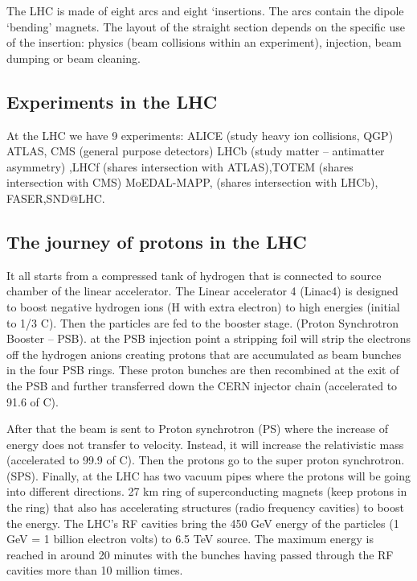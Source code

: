 The LHC is made of eight arcs and eight ‘insertions. The arcs contain the dipole ‘bending’ magnets. The layout of the straight section depends on the specific use of the insertion: physics (beam collisions within an experiment), injection, beam dumping or beam cleaning.

\subsection{Experiments in the LHC}

At the LHC we have 9 experiments: 
ALICE (study heavy ion collisions, QGP) ATLAS, CMS  (general purpose detectors) LHCb (study matter – antimatter asymmetry) ,LHCf (shares intersection with ATLAS),TOTEM (shares intersection with CMS) MoEDAL-MAPP, (shares intersection with LHCb), FASER,SND@LHC. 
\subsection{The journey of protons in the LHC}

It all starts from a compressed tank of hydrogen that is connected to source chamber of the linear accelerator. The Linear accelerator 4 (Linac4) is designed to boost negative hydrogen ions (H with extra electron) to high energies (initial to 1/3 C). Then the particles are fed to the booster stage. (Proton Synchrotron Booster – PSB).  at the PSB injection point a stripping foil will strip the electrons off the hydrogen anions creating protons that are accumulated as beam bunches in the four PSB rings. These proton bunches are then recombined at the exit of the PSB and further transferred down the CERN injector chain (accelerated to 91.6 of C).

After that the beam is sent to Proton synchrotron (PS) where the increase of energy does not transfer to velocity. Instead, it will increase the relativistic mass (accelerated to 99.9 of C). Then the protons go to the super proton synchrotron. (SPS). Finally, at the LHC has two vacuum pipes where the protons will be going into different directions. 27 km ring of superconducting magnets (keep protons in the ring) that also has accelerating structures (radio frequency cavities) to boost the energy. The LHC’s RF cavities bring the 450 GeV energy of the particles (1 GeV = 1 billion electron volts) to 6.5 TeV source. The maximum energy is reached in around 20 minutes with the bunches having passed through the RF cavities more than 10 million times.   

